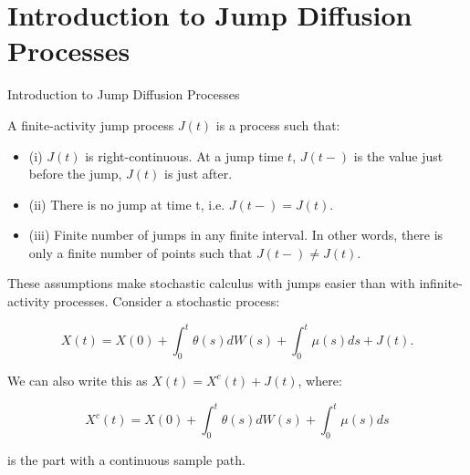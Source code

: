 \documentclass{beamer}
\begin{document}
\section{Introduction to Jump Diffusion Processes}
\begin{frame}{Introduction to Jump Diffusion Processes}

    {\footnotesize \footnotesize
    \par A finite-activity jump process $J(t)$ is a process such that:
    \begin{itemize}
        \item (i) \( J(t) \) is right-continuous. 
        At a jump time \( t \), \( J(t-) \) is the value just before the jump, \( J(t) \) is just after.
        \item (ii) There is no jump at time t, i.e. \( J(t-) = J(t) \).
        \item (iii) Finite number of jumps in any finite interval. In other words, there is only a finite number of points such that \( J(t-) \neq J(t) \).
    \end{itemize}
    \vspace{1em}
    \par  \pause These assumptions make stochastic 
    calculus with jumps easier than with infinite-activity processes. Consider a stochastic process: 

        \[
        X(t) = X(0) + \int_{0}^{t} \theta(s) dW(s) + \int_{0}^{t} \mu(s) ds + J(t).
        \]

    \par We can also write this as $X(t) = X^{c}(t) + J(t)$, where:
    

    \[
    X^{c}(t) = X(0) + \int_{0}^{t} \theta(s) dW(s) + \int_{0}^{t} \mu(s) ds
    \]

    \par is the part with a continuous sample path.

    }
\end{frame}
\end{document}
